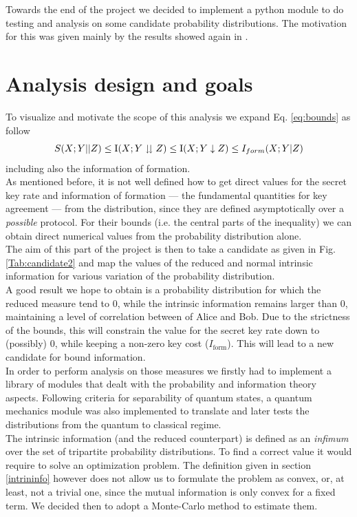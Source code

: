 \label{ch:six}
Towards the end of the project we decided to implement a python module to do testing and analysis on some candidate probability distributions. The motivation for this was given mainly by the results showed again in \cite{RW03}. 
\section{Analysis design and goals}
    To visualize and motivate the scope of this analysis we expand Eq. \ref{eq:bounds} as follow
    \begin{equation}
    	S(X;Y||Z) \leq \operatorname{I}(X;Y\downdownarrows Z) \leq \operatorname{I}(X;Y\downarrow Z) \leq I_{form} (X;Y|Z)
    \end{equation}
    including also the information of formation.\\
    As mentioned before, it is not well defined how to get direct values for the secret key rate and information of formation --- the fundamental quantities for key agreement --- from the distribution, since they are defined asymptotically over a \textit{possible} protocol. 
    For their bounds (i.e. the central parts of the inequality) we can obtain direct numerical values from the probability distribution alone. \\
    The aim of this part of the project is then to take a candidate as given in Fig. \ref{Tab:candidate2} and map the values of the reduced and normal intrinsic information for various variation of the probability distribution.\\
    
    A good result we hope to obtain is a probability distribution for which the reduced measure tend to $0$, while the intrinsic information remains larger than $0$, maintaining a level of correlation between of Alice and Bob. 
    Due to the strictness of the bounds, this will constrain the value for the secret key rate down to (possibly) $0$, while keeping a non-zero key cost ($I_{\text{form}}$).
    This will lead to a new candidate for bound information.\\
    
    In order to perform analysis on those measures we firstly had to implement a library of modules that dealt with the probability and information theory aspects.
    Following criteria for separability of quantum states, a quantum mechanics module was also implemented to translate and later tests the distributions from the quantum to classical regime.\\
    The intrinsic information (and the reduced counterpart) is defined as an \emph{infimum} over the set of tripartite probability distributions. 
    To find a correct value it would require to solve an optimization problem. 
    The definition given in section \ref{intrininfo} however does not allow us to formulate the problem as convex, or, at least, not a trivial one, since the mutual information is only convex for a fixed term.
    We decided then to adopt a Monte-Carlo method to estimate them.\\
     
